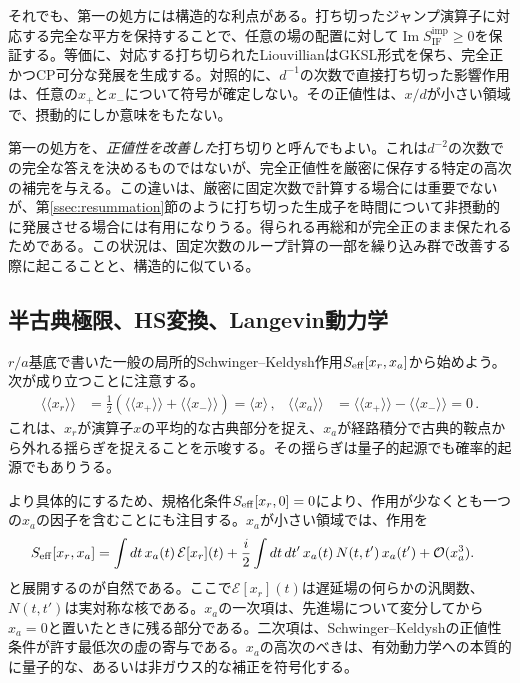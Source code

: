 \documentclass[a4paper,11pt,oneside]{article}
\theoremstyle{definition}
\numberwithin{equation}{section}
\newcommand{\ex}[1]{\langle #1 \rangle}
\begin{document}
それでも、第一の処方には構造的な利点がある。打ち切ったジャンプ演算子に対応する完全な平方を保持することで、任意の場の配置に対して\(
\operatorname{Im}S_{\mathrm{IF}}^{\mathrm{imp}}
\geq0
\)を保証する。等価に、対応する打ち切られたLiouvillianはGKSL形式を保ち、完全正かつCP可分な発展を生成する。対照的に、$d^{-1}$の次数で直接打ち切った影響作用は、任意の$x_{+}$と$x_{-}$について符号が確定しない。その正値性は、$x/d$が小さい領域で、摂動的にしか意味をもたない。



第一の処方を、\emph{正値性を改善した}打ち切りと呼んでもよい。これは$d^{-2}$の次数での完全な答えを決めるものではないが、完全正値性を厳密に保存する特定の高次の補完を与える。この違いは、厳密に固定次数で計算する場合には重要でないが、第\ref{ssec:resummation}節のように打ち切った生成子を時間について非摂動的に発展させる場合には有用になりうる。得られる再総和が完全正のまま保たれるためである。この状況は、固定次数のループ計算の一部を繰り込み群で改善する際に起こることと、構造的に似ている。






\subsection{半古典極限、HS変換、Langevin動力学}





\(r/a\)基底で書いた一般の局所的Schwinger--Keldysh作用$ S_{\rm eff}[x_r,x_a]   $から始めよう。次が成り立つことに注意する。
\begin{align}
\langle \! \langle x_{r} \rangle \! \rangle &= \frac{1}{2} (\langle \! \langle x_{+} \rangle \! \rangle+\langle \! \langle x_{-} \rangle \! \rangle)=\ex{x}\,, & \langle \! \langle x_{a} \rangle \! \rangle  &= \langle \! \langle x_{+} \rangle \! \rangle-\langle \! \langle x_{-} \rangle \! \rangle=0 \,.
\end{align}
これは、$ x_{r} $が演算子$ x $の平均的な古典部分を捉え、$ x_{a}$が経路積分で古典的鞍点から外れる揺らぎを捉えることを示唆する。その揺らぎは量子的起源でも確率的起源でもありうる。



より具体的にするため、規格化条件\(S_{\rm eff}[x_r,0]=0\)により、作用が少なくとも一つの\(x_a\)の因子を含むことにも注目する。\(x_a\)が小さい領域では、作用を
\begin{align}\label{aeexpansion}
S_{\rm eff}[x_r,x_a]
&=
\int dt\, x_a(t)\,\mathcal E[x_r](t)
+\frac{i}{2}\int dt\,dt'\,x_a(t)\,N(t,t')\,x_a(t') +\mathcal O(x_a^3) .
\end{align}
と展開するのが自然である。ここで\(\mathcal E[x_r](t)\)は遅延場の何らかの汎関数、\(N(t,t')\)は実対称な核である。\(x_a\)の一次項は、先進場について変分してから\(x_a=0\)と置いたときに残る部分である。二次項は、Schwinger--Keldyshの正値性条件が許す最低次の虚の寄与である。\(x_a\)の高次のべきは、有効動力学への本質的に量子的な、あるいは非ガウス的な補正を符号化する。
\end{document}
